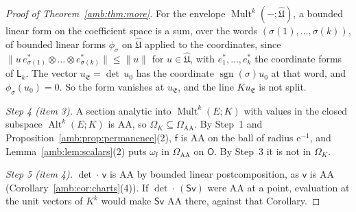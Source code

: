 \documentclass[11pt]{amsart}
\theoremstyle{definition}
\theoremstyle{remark}
\numberwithin{equation}{section}
\newcommand{\Alt}{\operatorname{Alt}}
\newcommand{\Mult}{\operatorname{Mult}}
\newcommand{\sgn}{\operatorname{sgn}}
\newcommand{\norm}[1]{\lVert #1\rVert}
\theoremstyle{plain}
\theoremstyle{definition}
\theoremstyle{plain}
\begin{document}
\begin{proof}[Proof of Theorem~\ref{amb:thm:more}]
For the envelope $\Mult^k(-;\widehat{\mathfrak U})$, a bounded linear form on the coefficient space is a sum, over the words $(\sigma(1),\dots,\sigma(k))$, of bounded linear forms $\phi_\sigma$ on $\widehat{\mathfrak U}$ applied to the coordinates, since $\norm{u\,e^*_{\sigma(1)}\otimes\dots\otimes e^*_{\sigma(k)}}\le\norm u$ for $u\in\widehat{\mathfrak U}$, with $e^*_1,\dots,e^*_k$ the coordinate forms of $\mathsf L_k$. The vector $u_{\mathfrak E}=\det\,u_0$ has the coordinate $\sgn(\sigma)u_0$ at that word, and $\phi_\sigma(u_0)=0$. So the form vanishes at $u_{\mathfrak E}$, and the line $Ku_{\mathfrak E}$ is not split.

\emph{Step 4 (item 3).} A section analytic into $\Mult^k(E;K)$ with values in the closed subspace $\Alt^k(E;K)$ is AA, so $\Omega_K\subseteq\Omega_{\mathrm{AA}}$. By Step~1 and Proposition~\ref{amb:prop:permanence}(2), $\mathsf f$ is AA on the ball of radius $\mathrm e^{-1}$, and Lemma~\ref{amb:lem:scalars}(2) puts $\omega_{\mathsf f}$ in $\Omega_{\mathrm{AA}}$ on $\mathsf O$. By Step~3 it is not in $\Omega_K$.

\emph{Step 5 (item 4).} $\det\cdot\,\mathsf v$ is AA by bounded linear postcomposition, as $\mathsf v$ is AA (Corollary~\ref{amb:cor:charts}(4)). If $\det\cdot\,(\mathsf S\mathsf v)$ were AA at a point, evaluation at the unit vectors of $K^k$ would make $\mathsf S\mathsf v$ AA there, against that Corollary.
\end{proof}
\end{document}
